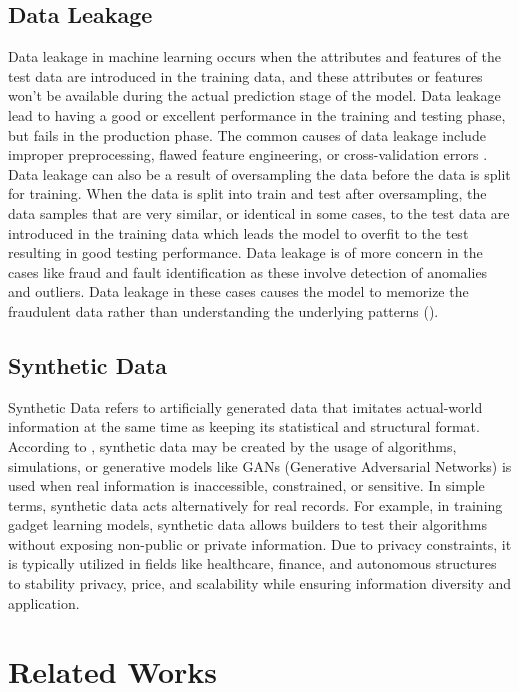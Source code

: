 \documentclass[twoside,11pt]{article}
\begin{document}
\begin{keywords}
\subsection{Data Leakage}
Data leakage in machine learning occurs when the attributes and features of the test data are introduced in the training data, and these attributes or features won't be available during the actual prediction stage of the model. Data leakage lead to having a good or excellent performance in the training and testing phase, but fails in the production phase. The common causes of data leakage include improper preprocessing, flawed feature engineering, or cross-validation errors \cite{Kaufman2012}. Data leakage can also be a result of oversampling the data before the data is split for training. When the data is split into train and test after oversampling, the data samples that are very similar, or identical in some cases, to the test data are introduced in the training data which leads the model to overfit to the test resulting in good testing performance. Data leakage is of more concern in the cases like fraud and fault identification as these involve detection of anomalies and outliers. Data leakage in these cases causes the model to memorize the fraudulent data rather than understanding the underlying patterns (\citealp{baesensRobROSERobustApproach2021}).

\subsection{Synthetic Data}
Synthetic Data refers to artificially generated data that imitates actual-world information at the same time as keeping its statistical and structural format. According to \citealp{SyntheticPatki2016}, synthetic data may be created by the usage of algorithms, simulations, or generative models like GANs (Generative Adversarial Networks) is used when real information is inaccessible, constrained, or sensitive.
In simple terms, synthetic data acts alternatively for real records. For example, in training gadget learning models, synthetic data allows builders to test their algorithms without exposing non-public or private information. Due to privacy constraints, it is typically utilized in fields like healthcare, finance, and autonomous structures to stability privacy, price, and scalability while ensuring information diversity and application.

\section{Related Works}\label{sec:relatedwork}


\end{keywords}
\end{document}
